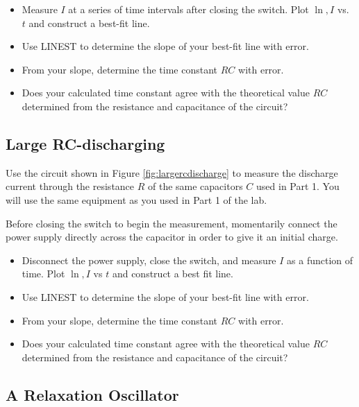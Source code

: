 \begin{itemize}
  \item Measure $I$ at a series of time intervals after closing the switch. Plot $\ln,I$ vs. $t$ and construct a best-fit line.
  \item Use LINEST to determine the slope of your best-fit line with error.
  \item From your slope, determine the time constant $RC$ with error.
  \item Does your calculated time constant agree with the theoretical value $RC$ determined from the resistance and capacitance of the circuit?
\end{itemize}

\subsection{Large RC-discharging}

Use the circuit shown in Figure \ref{fig:largercdischarge} to measure the discharge current through the resistance $R$ of the same capacitors $C$ used in Part 1. You will use the same equipment as you used in Part 1 of the lab. \myskip


Before closing the switch to begin the measurement, momentarily connect the power supply directly across the capacitor in order to give it an initial charge.
\begin{itemize}
  \item Disconnect the power supply, close the switch, and measure $I$ as a function of time. Plot $\ln,I$ vs $t$ and construct a best fit line.
  \item Use LINEST to determine the slope of your best-fit line with error.
  \item From your slope, determine the time constant $RC$ with error.
  \item Does your calculated time constant agree with the theoretical value $RC$ determined from the resistance and capacitance of the circuit?
\end{itemize}

\subsection{A Relaxation Oscillator}


